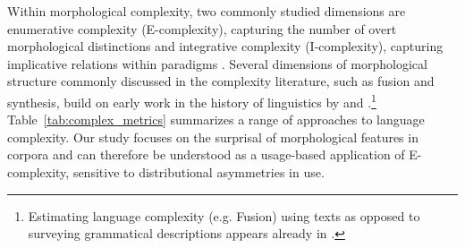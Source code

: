 \documentclass[USenglish]{article}
\begin{document}
Within morphological complexity, two commonly studied dimensions are enumerative complexity (E-complexity), capturing the number of overt morphological distinctions \citep{cotterell2019complexity, ackerman_morphological_2013} and integrative complexity (I-complexity), capturing implicative relations within paradigms \citep{kusters_linguistic_2003, ackerman_morphological_2013, cotterell2019complexity}.
Several dimensions of morphological structure commonly discussed in the complexity literature, such as fusion and synthesis, build on early work in the history of linguistics by \citet{sapir_introduction_1921} and \citet{greenberg_quantitative_1960}.\footnote{Estimating language complexity (e.g. Fusion) using texts as opposed to surveying grammatical descriptions appears already in \citet{greenberg_quantitative_1960}.}
Table~\ref{tab:complex_metrics} summarizes a range of approaches to language complexity. %
Our study focuses on the surprisal of morphological features in corpora and can therefore be understood as a usage-based application of E-complexity, sensitive to distributional asymmetries in use.
\end{document}
